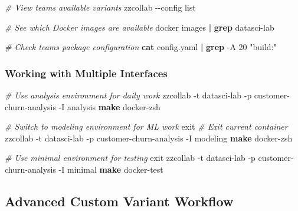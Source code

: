 \documentclass[
]{article}
\newenvironment{Shaded}{\begin{snugshade}}{\end{snugshade}}
\newcommand{\AttributeTok}[1]{\textcolor[rgb]{0.13,0.29,0.53}{#1}}
\newcommand{\BuiltInTok}[1]{#1}
\newcommand{\CommentTok}[1]{\textcolor[rgb]{0.56,0.35,0.01}{\textit{#1}}}
\newcommand{\ExtensionTok}[1]{#1}
\newcommand{\FunctionTok}[1]{\textcolor[rgb]{0.13,0.29,0.53}{\textbf{#1}}}
\newcommand{\KeywordTok}[1]{\textcolor[rgb]{0.13,0.29,0.53}{\textbf{#1}}}
\newcommand{\NormalTok}[1]{#1}
\newcommand{\StringTok}[1]{\textcolor[rgb]{0.31,0.60,0.02}{#1}}
\begin{document}
\begin{Shaded}
\begin{Highlighting}[]
\CommentTok{\# View team\textquotesingle{}s available variants}
\ExtensionTok{zzcollab} \AttributeTok{{-}{-}config}\NormalTok{ list}

\CommentTok{\# See which Docker images are available}
\ExtensionTok{docker}\NormalTok{ images }\KeywordTok{|} \FunctionTok{grep}\NormalTok{ datasci{-}lab}

\CommentTok{\# Check team\textquotesingle{}s package configuration}
\FunctionTok{cat}\NormalTok{ config.yaml }\KeywordTok{|} \FunctionTok{grep} \AttributeTok{{-}A}\NormalTok{ 20 }\StringTok{"build:"}
\end{Highlighting}
\end{Shaded}

\subsubsection{Working with Multiple
Interfaces}\label{working-with-multiple-interfaces}

\begin{Shaded}
\begin{Highlighting}[]
\CommentTok{\# Use analysis environment for daily work}
\ExtensionTok{zzcollab} \AttributeTok{{-}t}\NormalTok{ datasci{-}lab }\AttributeTok{{-}p}\NormalTok{ customer{-}churn{-}analysis }\AttributeTok{{-}I}\NormalTok{ analysis}
\FunctionTok{make}\NormalTok{ docker{-}zsh}

\CommentTok{\# Switch to modeling environment for ML work}
\BuiltInTok{exit}  \CommentTok{\# Exit current container}
\ExtensionTok{zzcollab} \AttributeTok{{-}t}\NormalTok{ datasci{-}lab }\AttributeTok{{-}p}\NormalTok{ customer{-}churn{-}analysis }\AttributeTok{{-}I}\NormalTok{ modeling}
\FunctionTok{make}\NormalTok{ docker{-}zsh}

\CommentTok{\# Use minimal environment for testing}
\BuiltInTok{exit}
\ExtensionTok{zzcollab} \AttributeTok{{-}t}\NormalTok{ datasci{-}lab }\AttributeTok{{-}p}\NormalTok{ customer{-}churn{-}analysis }\AttributeTok{{-}I}\NormalTok{ minimal}
\FunctionTok{make}\NormalTok{ docker{-}test}
\end{Highlighting}
\end{Shaded}

\subsection{Advanced Custom Variant
Workflow}\label{advanced-custom-variant-workflow}
\end{document}
